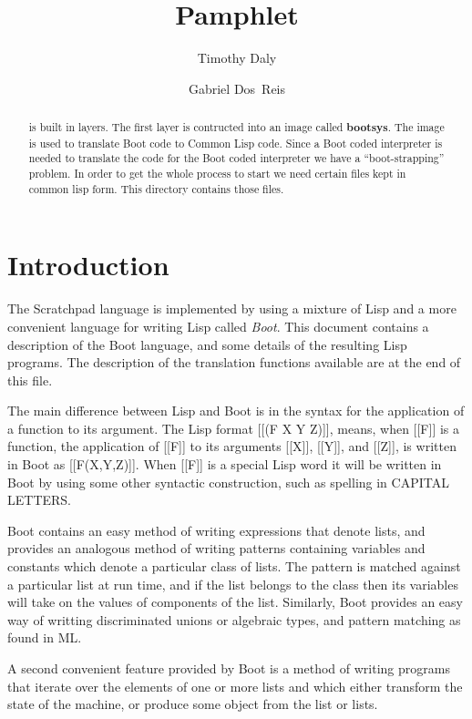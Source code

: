 \documentclass{article}
\title{\File{src/boot/Makefile} Pamphlet}
\author{Timothy Daly \and Gabriel Dos~Reis}
\begin{document}
\maketitle

\begin{abstract}
   is built in layers. The first layer is contructed into
  an image called {\bf bootsys}. The  image is used
  to translate Boot code to Common Lisp code.  Since a Boot coded
  interpreter is needed to translate the code for the Boot coded
  interpreter we have a ``boot-strapping'' problem.  In order to get
  the whole process to start we need certain files kept in
  common lisp form. This directory contains those files.
\end{abstract}
\eject

\tableofcontents
\eject

\section{Introduction}
\label{sec:intro}

The Scratchpad language is implemented by using a mixture of Lisp and
a more convenient language for writing Lisp called \emph{Boot}.
This document contains a description of the Boot language, and some
details of the resulting Lisp programs.
The description of the translation
functions available are at the end of this file.

The main difference between Lisp and Boot is in the syntax for
the application of a function to its argument.
The Lisp format [[(F X Y Z)]], means, when [[F]] is a function,
the application of [[F]] to its arguments [[X]], [[Y]], and [[Z]],
is written in Boot as [[F(X,Y,Z)]].
When [[F]] is a special Lisp word it will be written
in Boot by using some other syntactic construction, such as spelling
in CAPITAL LETTERS.

Boot contains an easy method of writing expressions that denote lists,
and provides an analogous method of writing patterns containing variables
and constants which denote a particular class of lists.  The pattern
is matched against a particular list at run time,
and if the list belongs to the class then its variables will
take on the values of components of the list.  Similarly, Boot provides
an easy way of writting discriminated unions or algebraic types, and
pattern matching as found in ML.

 A second convenient feature provided by Boot is a method of
writing programs that iterate over the elements of one or more lists
and which either transform the state of the machine, or
produce some object from the list or lists.
\end{document}
